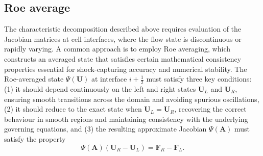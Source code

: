 
\subsection{Roe average}

The characteristic decomposition described above requires evaluation of the Jacobian matrices at cell interfaces, where the flow state is discontinuous or rapidly varying. A common approach is to employ Roe averaging, which constructs an averaged state that satisfies certain mathematical consistency properties essential for shock-capturing accuracy and numerical stability. The Roe-averaged state $\Psi(\mathbf{U})$ at interface $i+\frac{1}{2}$ must satisfy three key conditions: (1) it should depend continuously on the left and right states $\mathbf{U}_L$ and $\mathbf{U}_R$, ensuring smooth transitions across the domain and avoiding spurious oscillations, (2) it should reduce to the exact state when $\mathbf{U}_L = \mathbf{U}_R$, recovering the correct behaviour in smooth regions and maintaining consistency with the underlying governing equations, and (3) the resulting approximate Jacobian $\Psi(\mathbf{A})$ must satisfy the property  \begin{equation}
\Psi(\mathbf{A})(\mathbf{U}_R - \mathbf{U}_L) = \mathbf{F}_R - \mathbf{F}_L.
\end{equation}

